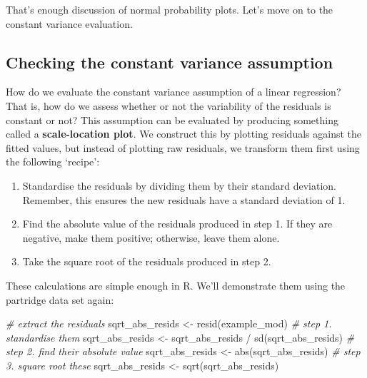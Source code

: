 \documentclass[
]{book}
\newenvironment{Shaded}{\begin{snugshade}}{\end{snugshade}}
\newcommand{\CommentTok}[1]{\textcolor[rgb]{0.56,0.35,0.01}{\textit{#1}}}
\newcommand{\FunctionTok}[1]{\textcolor[rgb]{0.00,0.00,0.00}{#1}}
\newcommand{\NormalTok}[1]{#1}
\newcommand{\OtherTok}[1]{\textcolor[rgb]{0.56,0.35,0.01}{#1}}
\newcommand{\SpecialCharTok}[1]{\textcolor[rgb]{0.00,0.00,0.00}{#1}}
\begin{document}
That's enough discussion of normal probability plots. Let's move on to the constant variance evaluation.

\hypertarget{checking-the-constant-variance-assumption}{%
\subsection{Checking the constant variance assumption}\label{checking-the-constant-variance-assumption}}

How do we evaluate the constant variance assumption of a linear regression? That is, how do we assess whether or not the variability of the residuals is constant or not? This assumption can be evaluated by producing something called a \textbf{scale-location plot}. We construct this by plotting residuals against the fitted values, but instead of plotting raw residuals, we transform them first using the following `recipe':

\begin{enumerate}
\def\labelenumi{\arabic{enumi}.}
\item
  Standardise the residuals by dividing them by their standard deviation. Remember, this ensures the new residuals have a standard deviation of 1.
\item
  Find the absolute value of the residuals produced in step 1. If they are negative, make them positive; otherwise, leave them alone.
\item
  Take the square root of the residuals produced in step 2.
\end{enumerate}

These calculations are simple enough in R. We'll demonstrate them using the partridge data set again:

\begin{Shaded}
\begin{Highlighting}[]
\CommentTok{\# extract the residuals}
\NormalTok{sqrt\_abs\_resids }\OtherTok{\textless{}{-}} \FunctionTok{resid}\NormalTok{(example\_mod)}
\CommentTok{\# step 1. standardise them}
\NormalTok{sqrt\_abs\_resids }\OtherTok{\textless{}{-}}\NormalTok{ sqrt\_abs\_resids }\SpecialCharTok{/} \FunctionTok{sd}\NormalTok{(sqrt\_abs\_resids)}
\CommentTok{\# step 2. find their absolute value}
\NormalTok{sqrt\_abs\_resids }\OtherTok{\textless{}{-}} \FunctionTok{abs}\NormalTok{(sqrt\_abs\_resids)}
\CommentTok{\# step 3. square root these}
\NormalTok{sqrt\_abs\_resids }\OtherTok{\textless{}{-}} \FunctionTok{sqrt}\NormalTok{(sqrt\_abs\_resids)}
\end{Highlighting}
\end{Shaded}
\end{document}
